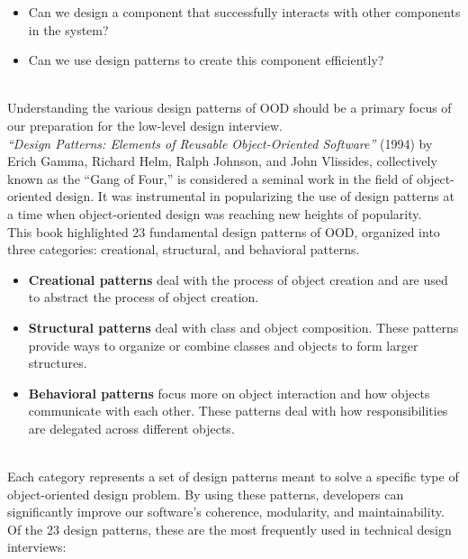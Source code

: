 \begin{itemize}
\item
\protect{}\label{6MPfE57949432lRU7NQAd}
Can we design a component that successfully interacts with other components in the system?
\item
\protect{}\label{dCvTR6gYKRnLtiY8w_5Zv}
Can we use design patterns to create this component efficiently?
\end{itemize}
\\
Understanding the various design patterns of OOD should be a primary focus of our preparation for the low-level design interview.
\\
\emph{``Design Patterns: Elements of Reusable Object-Oriented Software''} (1994) by Erich Gamma, Richard Helm, Ralph Johnson, and John Vlissides, collectively known as the ``Gang of Four,'' is considered a seminal work in the field of object-oriented design. It was instrumental in popularizing the use of design patterns at a time when object-oriented design was reaching new heights of popularity.
\\
This book highlighted 23 fundamental design patterns of OOD, organized into three categories: creational, structural, and behavioral patterns.

\begin{itemize}
\item
\protect{}\label{yEZB5A-aztSJCWMh8Pbgi}
\textbf{Creational patterns} deal with the process of object creation and are used to abstract the process of object creation.
\item
\protect{}\label{2sYDSHEDKBLMGdVLEkUm_}
\textbf{Structural patterns} deal with class and object composition. These patterns provide ways to organize or combine classes and objects to form larger structures.
\item
\protect{}\label{hDVY5qkMx3-BQsBoZU3Uo}
\textbf{Behavioral patterns} focus more on object interaction and how objects communicate with each other. These patterns deal with how responsibilities are delegated across different objects.
\end{itemize}
\\
Each category represents a set of design patterns meant to solve a specific type of object-oriented design problem. By using these patterns, developers can significantly improve our software's coherence, modularity, and maintainability.
\\
Of the 23 design patterns, these are the most frequently used in technical design interviews:

